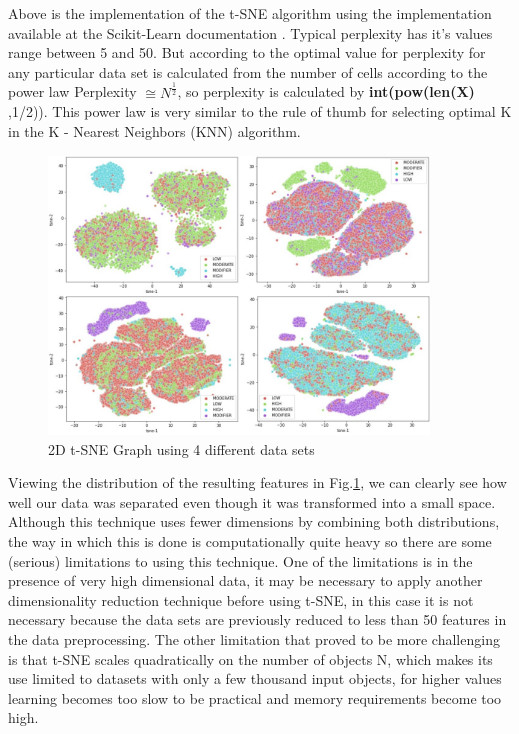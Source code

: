 Above is the implementation of the t-SNE algorithm using the implementation available at the Scikit-Learn documentation \cite{scikit-learn}. Typical perplexity has it's values range between 5 and 50. But according to \cite{wattenberg2016how} the optimal value for perplexity for any particular data set is calculated from the number of cells according to the power law Perplexity \(\cong N^\frac{1}{2}\), so perplexity is calculated by \textbf{int(pow(len(X)} ,1/2)). This power law is very similar to the rule of thumb for selecting optimal K in the K - Nearest Neighbors (KNN) algorithm.  

\begin{figure}[h]
    \centering
    \includegraphics[width=0.9\textwidth,height=0.35\textheight]{Chapters/Figures/tsne4.1.jpg}
    \caption{2D t-SNE Graph using 4 different data sets}
    \label{fig:tsne_graph}
\end{figure}

Viewing the distribution of the resulting features in Fig.\ref{fig:tsne_graph}, we can clearly see how well our data was separated even though it was transformed into a small space. Although this technique uses fewer dimensions by combining both distributions, the way in which this is done is computationally quite heavy so there are some (serious) limitations to using this technique. One of the limitations is in the presence of very high dimensional data, it may be necessary to apply another dimensionality reduction technique before using t-SNE, in this case it is not necessary because the data sets are previously reduced to less than 50 features in the data preprocessing. The other limitation that proved to be more challenging is that t-SNE scales quadratically on the number of objects N, which makes its use limited to datasets with only a few thousand input objects, for higher values learning becomes too slow to be practical and memory requirements become too high.

